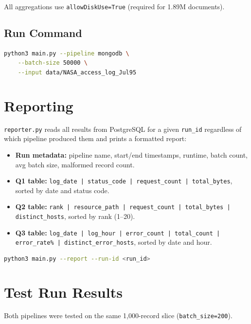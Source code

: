 \documentclass[12pt,a4paper]{article}
\begin{document}
All aggregations use \texttt{allowDiskUse=True} (required for 1.89M documents).

\subsection{Run Command}

\begin{lstlisting}[language=bash]
python3 main.py --pipeline mongodb \
    --batch-size 50000 \
    --input data/NASA_access_log_Jul95
\end{lstlisting}

\section{Reporting}

\texttt{reporter.py} reads all results from PostgreSQL for a given \texttt{run\_id} regardless
of which pipeline produced them and prints a formatted report:

\begin{itemize}
  \item \textbf{Run metadata:} pipeline name, start/end timestamps, runtime, batch count,
        avg batch size, malformed record count.
  \item \textbf{Q1 table:} \texttt{log\_date | status\_code | request\_count | total\_bytes},
        sorted by date and status code.
  \item \textbf{Q2 table:} \texttt{rank | resource\_path | request\_count | total\_bytes |
        distinct\_hosts}, sorted by rank (1--20).
  \item \textbf{Q3 table:} \texttt{log\_date | log\_hour | error\_count | total\_count |
        error\_rate\% | distinct\_error\_hosts}, sorted by date and hour.
\end{itemize}

\begin{lstlisting}[language=bash]
python3 main.py --report --run-id <run_id>
\end{lstlisting}

\section{Test Run Results}

Both pipelines were tested on the same 1,000-record slice (\texttt{batch\_size=200}).
\end{document}
